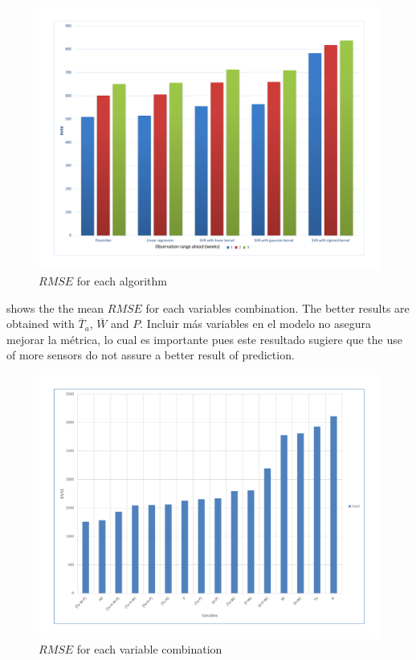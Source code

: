 %
\begin{figure}[H] 
 \centering
 \includegraphics[scale=.5]{Usado_Algorithms-RMSE}
 \caption{$RMSE$ for each algorithm} 
 \label{figura6} 
\end{figure}
%
 shows the the mean $RMSE$ for each variables combination. The better results are obtained with $\overline{T}_{a}$, $\overline{W}$ and $P$.  Incluir más variables en el modelo no asegura mejorar la métrica, lo cual es importante pues este resultado sugiere que the use of more sensors do not assure a better result of prediction. 
%
\begin{figure}[H] 
 \centering
 \includegraphics[scale=.5]{Usado_Variables-RMSE}
 \caption{$RMSE$ for each variable combination} 
 \label{figura7} 
\end{figure}
%


